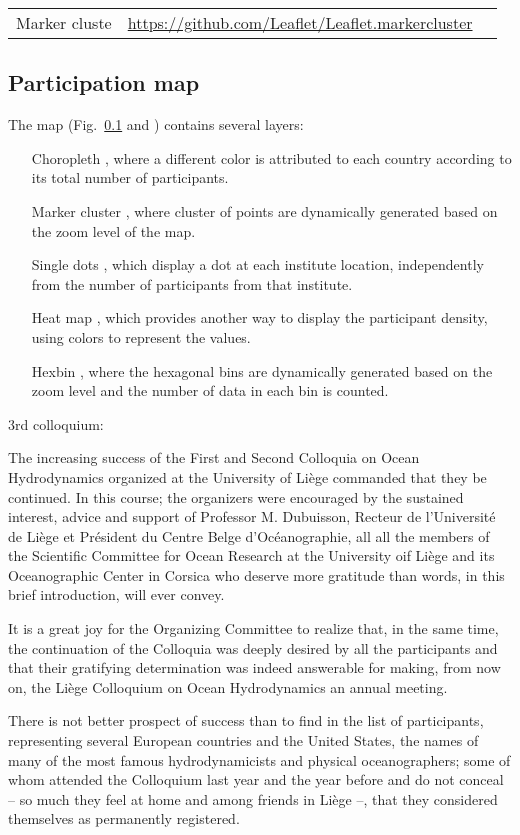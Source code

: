 \documentclass[12pt,a4paper,oneside,final]{article}
\begin{document}
\begin{tabular}{ccc}
Marker cluste & \url{https://github.com/Leaflet/Leaflet.markercluster}\\
\end{tabular}

\subsection{Participation map}

The map (Fig.~\ref{} and \url{}) contains several layers: 
\begin{enumerate}
\item[Choropleth], where a different color is attributed to each country according to its total number of participants.
\item[Marker cluster], where cluster of points are dynamically generated based on the zoom level of the map.
\item[Single dots], which display a dot at each institute location, independently from the number of participants from that institute.
\item[Heat map], which provides another way to display the participant density, using colors to represent the values.
\item[Hexbin], where the hexagonal bins are dynamically generated based on the zoom level and the number of data in each bin is counted.
\end{enumerate}




3rd colloquium:

The increasing success of the First and Second Colloquia on Ocean Hydrodynamics organized at the University of Liège commanded that they be continued. In this course; the organizers were encouraged by the sustained interest, advice and support of Professor M. Dubuisson, Recteur de l'Université de Liège et Président du Centre Belge d'Océanographie, all all the members of the Scientific Committee for Ocean Research at the University oif Liège and its Oceanographic Center in Corsica who deserve more gratitude than words, in this brief introduction, will ever convey.

It is a great joy for the Organizing Committee to realize that, in the same time, the continuation of the Colloquia was deeply desired by all the participants and that their gratifying determination was indeed answerable for making, from now on, the Liège Colloquium on Ocean Hydrodynamics an annual meeting.

There is not better prospect of success than to find in the list of participants, representing several European countries and the United States, the names of many of the most famous hydrodynamicists and physical oceanographers; some of whom attended the Colloquium last year and the year before and do not conceal -- so much they feel at home and among friends in Liège --, that they considered themselves as permanently registered. 
\end{document}
